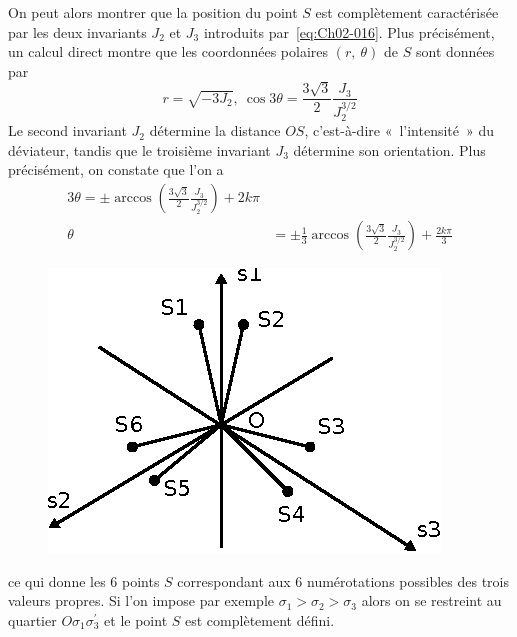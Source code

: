 On peut alors montrer que la position du point $S$ est complètement caractérisée par les deux invariants $J_2$ et $J_3$ introduits par~\eqref{eq:Ch02-016}.
Plus précisément, un calcul direct montre que les coordonnées polaires $\left( r,\ \theta \right)$ de $S$ sont données par 
\begin{equation}
    r = \sqrt{-3J_2},\ \cos 3 \theta = \frac{3\sqrt{3}}{2}\frac{J_3}{J_2^{3/2}}
    \label{eq:Ch02-029}
\end{equation}
Le second invariant $J_2$ détermine la distance $OS$, c'est-à-dire «~l'intensité~» du déviateur, tandis que le troisième invariant $J_3$ détermine son orientation. 
Plus précisément, on constate que l'on a 
\begin{align}
    3\theta = \pm \arccos \left( \frac{3\sqrt{3}}{2} \frac{J_3}{J_2^{3/2}} \right) + 2 k \pi\nonumber\\
    \theta &= \pm \frac{1}{3}\arccos \left( \frac{3\sqrt{3}}{2} \frac{J_3}{J_2^{3/2}} \right) + \frac{2 k \pi}{3}
    \label{eq:Ch02-030}
\end{align}
\begin{figure}
    \begin{center}
        \includegraphics{../images/T1_Ch02-0014}
    \end{center}
\end{figure}
ce qui donne les 6 points $S$ correspondant aux 6 numérotations possibles des trois valeurs propres. 
Si l'on impose par exemple $\sigma_1 > \sigma_2 > \sigma_3$ alors on se restreint au quartier $O\sigma_1\sigma_3^{\prime}$ et le point $S$ est complètement défini. 

